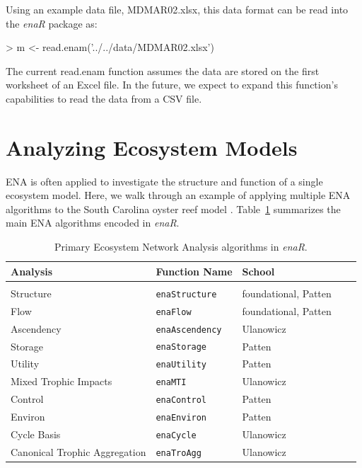 \documentclass[article]{jss}
\begin{document}
Using an example data file, MDMAR02.xlsx, this data format can be read
into the \textit{enaR} package as:

\begin{Schunk}
\begin{Sinput}
>   m <- read.enam('../../data/MDMAR02.xlsx')
\end{Sinput}
\end{Schunk}

The current read.enam function assumes the data are stored on the
first worksheet of an Excel file. In the future, we expect to expand
this function's capabilities to read the data from a CSV file.


\section{Analyzing Ecosystem Models}

ENA is often applied to investigate the structure and function of a
single ecosystem model.  Here, we walk through an example of applying
multiple ENA algorithms to the South Carolina oyster reef model
\citep{dame81}.  Table~\ref{tab:alg} summarizes the main ENA
algorithms encoded in \textit{enaR}.


\begin{table}
\center
\caption{Primary Ecosystem Network Analysis algorithms in
  \textit{enaR}.} \label{tab:alg}
\tableline
\begin{tabularx}{\textwidth}{l l l l l }
\textbf{Analysis} & \textbf{Function Name} & \textbf{School} \\ \hline \\ [-1ex]
Structure & \texttt{enaStructure} & foundational, Patten \\
Flow & \texttt{enaFlow} & foundational, Patten \\
Ascendency & \texttt{enaAscendency} & Ulanowicz \\
Storage & \texttt{enaStorage} & Patten \\
Utility & \texttt{enaUtility} & Patten \\
Mixed Trophic Impacts & \texttt{enaMTI} & Ulanowicz \\
Control & \texttt{enaControl} & Patten \\
Environ & \texttt{enaEnviron} & Patten \\
Cycle Basis & \texttt{enaCycle} & Ulanowicz \\
Canonical Trophic Aggregation & \texttt{enaTroAgg} & Ulanowicz \\ \hline
\end{tabularx}
\tableline
\end{table}
\end{document}
